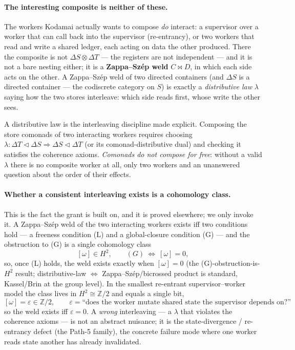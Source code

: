 \documentclass[11pt]{article}
\newcommand{\comp}{\mathbin{\triangleleft}}       %
\newcommand{\zs}{\bowtie}                          %
\theoremstyle{plain}
\theoremstyle{definition}
\begin{document}
\paragraph{The interesting composite is neither of these.} The workers Kodamai actually wants to
compose \emph{do} interact: a supervisor over a worker that can call back into the supervisor
(re-entrancy), or two workers that read and write a shared ledger, each acting on data the other
produced. There the composite is not $\Delta S\otimes\Delta T$ --- the registers are not independent
--- and it is not a bare nesting either; it is a \textbf{Zappa--Sz\'ep weld} $C\zs D$, in which each
side acts on the other. A Zappa--Sz\'ep weld of two directed containers (and $\Delta S$ is a directed
container --- the codiscrete category on $S$) is exactly a \emph{distributive law} $\lambda$ saying
how the two stores interleave: which side reads first, whose write the other sees.

\begin{deepbox}
A distributive law is the interleaving discipline made explicit. Composing the store comonads of two
interacting workers requires choosing $\lambda:\Delta T\comp\Delta S\Rightarrow\Delta S\comp\Delta T$
(or its comonad-distributive dual) and checking it satisfies the coherence axioms. \emph{Comonads do
not compose for free}: without a valid $\lambda$ there is no composite worker at all, only two workers
and an unanswered question about the order of their effects.
\end{deepbox}

\paragraph{Whether a consistent interleaving exists is a cohomology class.} This is the fact the
grant is built on, and it is proved elsewhere; we only invoke it. A Zappa--Sz\'ep weld of the two
interacting workers exists iff two conditions hold --- a freeness condition (L) and a global-closure
condition (G) --- and the obstruction to (G) is a single cohomology class
\[
  [\omega]\in H^2,
  \qquad (G)\ \Longleftrightarrow\ [\omega]=0,
\]
so, once (L) holds, the weld exists exactly when $[\omega]=0$ (the (G)-obstruction-is-$H^2$ result;
distributive-law $\Leftrightarrow$ Zappa--Sz\'ep/bicrossed product is standard, Kassel/Brin at the
group level). In the smallest re-entrant supervisor--worker
model the class lives in $H^2\cong\mathbb{Z}/2$ and equals a single bit,
\begin{equation}\label{eq:omega}
  [\omega]=\varepsilon\in\mathbb{Z}/2,
  \qquad
  \varepsilon = \text{``does the worker mutate shared state the supervisor depends on?''}
\end{equation}
so the weld exists iff $\varepsilon=0$. A \emph{wrong} interleaving --- a $\lambda$ that violates the
coherence axioms --- is not an abstract nuisance; it is the state-divergence / re-entrancy defect
(the Path-5 family), the concrete failure mode where one worker reads state another has already
invalidated.
\end{document}
